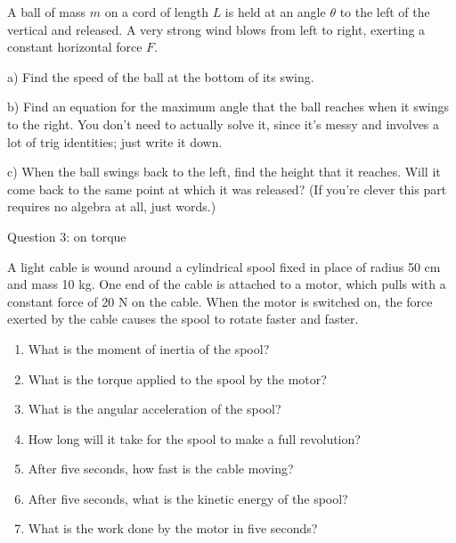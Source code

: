 \documentclass[12pt]{article}
\begin{document}
A ball of mass $m$ on a cord of length $L$ is held at an angle $\theta$ to the left of the
vertical and released. A very strong wind blows from left to right, exerting a constant horizontal
force $F$.

a) Find the speed of the ball at the bottom of its swing.

\vspace{2in}

b) Find an equation for the maximum angle that the ball reaches when it swings to the 
right. You don't need to actually solve it, since it's messy and involves a lot of trig
identities; just write it down.

\vspace{3in}

c) When the ball swings back to the left, find the height that it reaches. Will it 
come back to the same point at which it was released? (If you're clever this part requires
no algebra at all, just words.)

\newpage
\centerline{\large Question 3: on torque} 

\vspace{1in}

  A light cable is wound around a cylindrical spool fixed in place of radius 50 cm and mass 10 kg. One end of the cable is attached to a motor, which pulls with a constant force of 20 N on the cable. When the motor is switched on, the force exerted by the cable causes the spool to rotate faster and faster.
\begin{enumerate}
      \item{What is the moment of inertia of the spool?}
\vspace{0.7in}
      \item{What is the torque applied to the spool by the motor?}
\vspace{0.7in}
      \item{What is the angular acceleration of the spool?}
\vspace{0.7in}
      \item{How long will it take for the spool to make a full revolution?}
\vspace{0.7in}
      \item{After five seconds, how fast is the cable moving?}
\vspace{0.7in}
      \item{After five seconds, what is the kinetic energy of the spool?}
\vspace{0.7in}
      \item{What is the work done by the motor in five seconds?}
     \end{enumerate}
\newpage
\end{document}
